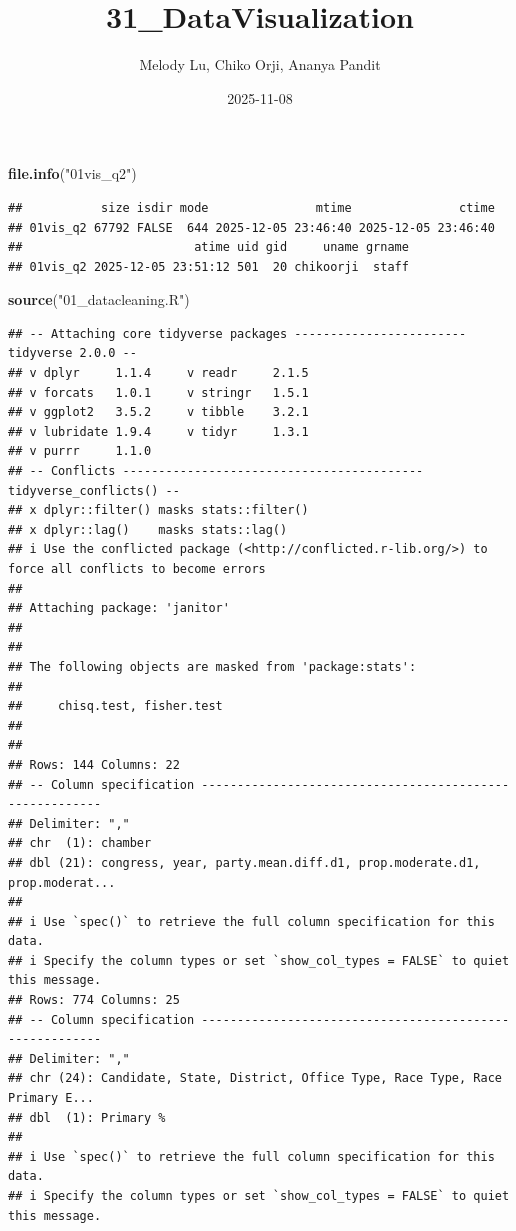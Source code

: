 \documentclass[
]{article}
\title{31\_DataVisualization}
\author{Melody Lu, Chiko Orji, Ananya Pandit}
\date{2025-11-08}
\newenvironment{Shaded}{\begin{snugshade}}{\end{snugshade}}
\newcommand{\FunctionTok}[1]{\textcolor[rgb]{0.13,0.29,0.53}{\textbf{#1}}}
\newcommand{\NormalTok}[1]{#1}
\newcommand{\StringTok}[1]{\textcolor[rgb]{0.31,0.60,0.02}{#1}}
\begin{document}
\maketitle

\begin{Shaded}
\begin{Highlighting}[]
\FunctionTok{file.info}\NormalTok{(}\StringTok{"01vis\_q2"}\NormalTok{)}
\end{Highlighting}
\end{Shaded}

\begin{verbatim}
##           size isdir mode               mtime               ctime
## 01vis_q2 67792 FALSE  644 2025-12-05 23:46:40 2025-12-05 23:46:40
##                        atime uid gid     uname grname
## 01vis_q2 2025-12-05 23:51:12 501  20 chikoorji  staff
\end{verbatim}

\begin{Shaded}
\begin{Highlighting}[]
\FunctionTok{source}\NormalTok{(}\StringTok{"01\_datacleaning.R"}\NormalTok{)}
\end{Highlighting}
\end{Shaded}

\begin{verbatim}
## -- Attaching core tidyverse packages ------------------------ tidyverse 2.0.0 --
## v dplyr     1.1.4     v readr     2.1.5
## v forcats   1.0.1     v stringr   1.5.1
## v ggplot2   3.5.2     v tibble    3.2.1
## v lubridate 1.9.4     v tidyr     1.3.1
## v purrr     1.1.0     
## -- Conflicts ------------------------------------------ tidyverse_conflicts() --
## x dplyr::filter() masks stats::filter()
## x dplyr::lag()    masks stats::lag()
## i Use the conflicted package (<http://conflicted.r-lib.org/>) to force all conflicts to become errors
## 
## Attaching package: 'janitor'
## 
## 
## The following objects are masked from 'package:stats':
## 
##     chisq.test, fisher.test
## 
## 
## Rows: 144 Columns: 22
## -- Column specification --------------------------------------------------------
## Delimiter: ","
## chr  (1): chamber
## dbl (21): congress, year, party.mean.diff.d1, prop.moderate.d1, prop.moderat...
## 
## i Use `spec()` to retrieve the full column specification for this data.
## i Specify the column types or set `show_col_types = FALSE` to quiet this message.
## Rows: 774 Columns: 25
## -- Column specification --------------------------------------------------------
## Delimiter: ","
## chr (24): Candidate, State, District, Office Type, Race Type, Race Primary E...
## dbl  (1): Primary %
## 
## i Use `spec()` to retrieve the full column specification for this data.
## i Specify the column types or set `show_col_types = FALSE` to quiet this message.
\end{verbatim}
\end{document}
